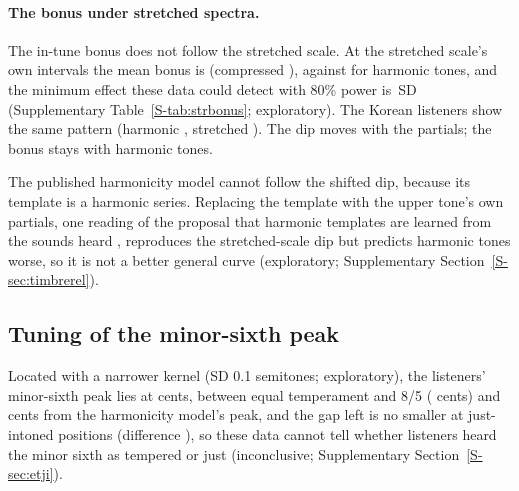 \documentclass[11pt,a4paper]{article}
\newcommand{\SDu}{\,SD}
\begin{document}
\paragraph{The bonus under stretched spectra.}
The in-tune bonus does not follow the stretched scale. At the
stretched scale's own intervals the mean bonus is \sbOwnStr{} (compressed \sbOwnComp), against
\sbOwnHarm{} for harmonic tones, and the minimum effect these data could detect with 80\%
power is \sbMdeStr\SDu{} (Supplementary Table~\ref{S-tab:strbonus}; exploratory). The Korean
listeners show the same pattern (harmonic \sbOwnHarmKr, stretched \sbOwnStrKr). The dip moves
with the partials; the bonus stays with harmonic tones.

The published harmonicity model cannot follow the shifted dip, because its template is a
harmonic series. Replacing the template with the upper tone's own partials, one reading of the
proposal that harmonic templates are learned from the sounds heard \citep{shamma2000},
reproduces the stretched-scale dip but predicts harmonic tones worse, so it is not a better
general curve (exploratory; Supplementary Section~\ref{S-sec:timbrerel}).

\subsection{Tuning of the minor-sixth peak}
\label{sec:tuning}
Located with a narrower kernel (SD 0.1 semitones; exploratory), the listeners' minor-sixth
peak lies at \ejLocMsix{} cents, between equal temperament and 8/5 (\jiCentsMsix{} cents) and
\ejDiffMsix{} cents from the harmonicity model's peak, and the gap left is no smaller at
just-intoned positions (difference \ejGapJIaDiff), so these data cannot tell whether listeners
heard the minor sixth as tempered or just (inconclusive; Supplementary
Section~\ref{S-sec:etji}).
\end{document}
